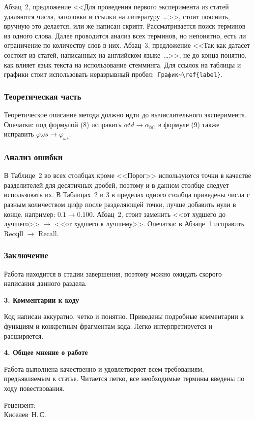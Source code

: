 \documentclass[12pt, a4paper]{extarticle}
\begin{document}
Абзац~2, предложение <<Для проведения первого эксперимента из статей удаляются числа, заголовки
и ссылки на литературу~\ldots>>, стоит пояснить, вручную это делается, или же написан скрипт.
Рассматривается поиск терминов из одного слова. Далее проводится анализ всех терминов, но 
непонятно, есть ли ограничение по количеству слов в них.
Абзац~3, предложение <<Так как датасет состоит из статей, написанных на английском языке~\ldots>>,
не до конца понятно, как влияет язык текста на использование стемминга.
Для ссылок на таблицы и графики стоит использовать неразрывный пробел:~\verb|График~\ref{label}|.

\subsubsection*{Теоретическая часть}

Теоретическое описание метода должно идти до вычислительного эксперимента.
Опечатки: под формулой (8) исправить $\alpha td \to \alpha_{td}$, в формуле (9) также исправить
$\varphi \omega s \to \varphi_{\omega s}$.  

\subsubsection*{Анализ ошибки}

В Таблице~2 во всех столбцах кроме <<Порог>> используются точки в качестве разделителей для 
десятичных дробей, поэтому и в данном столбце следует использовать их.
В Таблицах~2 и 3 в пределах одного столбца приведены числа с разным количеством цифр после разделяющей
точки, лучше добавить нули в конце, например: $0.1 \to 0.100$.
Абзац~2, стоит заменить <<от худшего до лучшего>> $\to$ <<от худшего к лучшему>>.
Опечатка: в Абзаце~1 исправить Rec\textbf{q}ll $\to$ Recall.

\subsubsection*{Заключение}

Работа находится в стадии завершения, поэтому можно ожидать скорого написания данного раздела.

\begin{center}
    \textbf{3. Комментарии к коду}
\end{center}

Код написан аккуратно, четко и понятно. Приведены подробные комментарии к функциям и конкретным
фрагментам кода. Легко интерпретируется и расширяется.

\begin{center}
    \textbf{4. Общее мнение о работе}
\end{center}

Работа выполнена качественно и удовлетворяет всем требованиям, предъявляемым к статье.
Читается легко, все необходимые термины введены по ходу повествования.

\vspace{2cm}

\begin{flushleft}
    Рецензент:\\
    Киселев~Н.\,С.
\end{flushleft}
\end{document}
